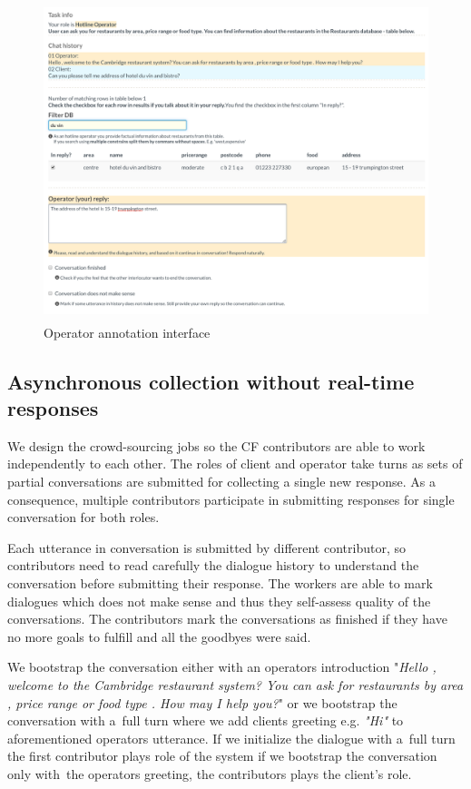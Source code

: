 \documentclass[runningheads,a4paper]{llncs}
\begin{document}
\begin{figure}
\begin{center}
\includegraphics[height=25em]{gui-annotators-system}
\caption{Operator annotation interface}
\end{center}
\vspace{-0.80em}
\label{fig:operator}
\end{figure}

\subsection{Asynchronous collection without real-time responses}
\label{sec:async}
We design the crowd-sourcing jobs so the CF contributors are able to work independently to each other.
The roles of client and operator take turns as sets of partial conversations are submitted for collecting a single new response.
As a consequence, multiple contributors participate in submitting responses for single conversation for both roles.

Each utterance in conversation is submitted by different contributor, so contributors need to read carefully the dialogue history to understand the conversation before submitting their response.
The workers are able to mark dialogues which does not make sense and thus they self-assess quality of the conversations.
The contributors mark the conversations as finished if they have no more goals to fulfill and all the goodbyes were said.

We bootstrap the conversation either with an operators introduction "{\it Hello , welcome to the Cambridge restaurant system? You can ask for restaurants by area , price range or food type . How may I help you?}" or we bootstrap the conversation with a~full turn where we add clients greeting e.g. {\it "Hi"} to aforementioned operators utterance.
If we initialize the dialogue with a~full turn the first contributor plays role of the system if we bootstrap the conversation only with~the operators greeting, the contributors plays the client's role.
\end{document}
